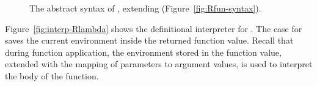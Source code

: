 \documentclass[7x10,nocrop]{TimesAPriori_MIT}%
\newcommand{\gray}[1]{{\color{gray} #1}}
\def\racketEd{0}
\def\pythonEd{1}
\def\edition{1}
\begin{document}
\begin{figure}[tp]
\centering
\fbox{
  \begin{minipage}{0.96\textwidth}
    \small
{\if\edition\racketEd
\[
\begin{array}{l}
  \gray{\LintOpAST} \\ \hline
  \gray{\LvarASTRacket{}} \\ \hline
  \gray{\LifASTRacket{}} \\ \hline
  \gray{\LwhileASTRacket{}} \\ \hline
  \gray{\LtupASTRacket{}} \\ \hline
  \gray{\LfunASTRacket} \\ \hline
  \LlambdaASTRacket \\
  \begin{array}{lcl}
  \LangLamM{} &::=& \PROGRAMDEFSEXP{\code{'()}}{\LP\Def\ldots\RP}{\Exp}
  \end{array}
\end{array}
\]
\fi}
{\if\edition\pythonEd
\[
\begin{array}{l}
  \gray{\LintASTPython} \\ \hline
  \gray{\LvarASTPython{}} \\ \hline
  \gray{\LifASTPython{}} \\ \hline
  \gray{\LwhileASTPython{}} \\ \hline
  \gray{\LtupASTPython{}} \\ \hline
  \gray{\LfunASTPython} \\ \hline
  \LlambdaASTPython \\
  \begin{array}{lcl}
  \LangLamM{} &::=& \PROGRAM{}{\LS \Def \ldots \Stmt \ldots \RS}
  \end{array}
\end{array}
\]
\fi}
\end{minipage}
}
\caption{The abstract syntax of \LangLam{}, extending \LangFun{} (Figure~\ref{fig:Rfun-syntax}).}
\label{fig:Rlam-syntax}
\end{figure}

\label{sec:interp-Rlambda}

Figure~\ref{fig:interp-Rlambda} shows the definitional interpreter for
\LangLam{}. The case for  saves the current environment
inside the returned function value. Recall that during function
application, the environment stored in the function value, extended
with the mapping of parameters to argument values, is used to
interpret the body of the function.
\end{document}
